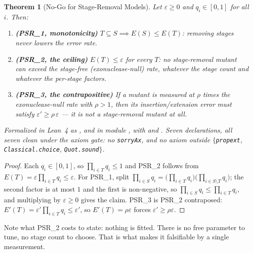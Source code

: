 \documentclass[11pt,a4paper]{article}
\newtheorem{theorem}{Theorem}[section]
\theoremstyle{definition}
\theoremstyle{remark}
\begin{document}
\begin{theorem}[No-Go for Stage-Removal Models]\label{thm:psr}
Let $\varepsilon \ge 0$ and $q_i \in [0,1]$ for all $i$. Then:
\begin{enumerate}
  \item \textbf{(PSR\_1, monotonicity)} $T \subseteq S \implies E(S) \le E(T)$: removing stages never lowers the error rate.
  \item \textbf{(PSR\_2, the ceiling)} $E(T) \le \varepsilon$ for every $T$: \emph{no} stage-removal mutant can exceed the stage-free (exonuclease-null) rate, whatever the stage count and whatever the per-stage factors.
  \item \textbf{(PSR\_3, the contrapositive)} If a mutant is measured at $\rho$ times the exonuclease-null rate with $\rho > 1$, then its insertion/extension error must satisfy $\varepsilon' \ge \rho\,\varepsilon$ --- it is not a stage-removal mutant at all.
\end{enumerate}
Formalized in Lean~4 as ,  and  in module , with  and . Seven declarations, all seven clean under the axiom gate: no \texttt{sorryAx}, and no axiom outside $\{$\texttt{propext}, \texttt{Classical.choice}, \texttt{Quot.sound}$\}$.
\end{theorem}

\begin{proof}
Each $q_i \in [0,1]$, so $\prod_{i \in T} q_i \le 1$ and PSR\_2 follows from $E(T) = \varepsilon \prod_{i\in T} q_i \le \varepsilon$. For PSR\_1, split $\prod_{i\in S} q_i = \big(\prod_{i\in T} q_i\big)\big(\prod_{i \in S\setminus T} q_i\big)$; the second factor is at most $1$ and the first is non-negative, so $\prod_{i\in S} q_i \le \prod_{i \in T} q_i$, and multiplying by $\varepsilon \ge 0$ gives the claim. PSR\_3 is PSR\_2 contraposed: $E'(T) = \varepsilon'\prod_{i\in T} q_i \le \varepsilon'$, so $E'(T) = \rho\varepsilon$ forces $\varepsilon' \ge \rho\varepsilon$.
\end{proof}

Note what PSR\_2 costs to state: nothing is fitted. There is no free parameter to tune, no stage count to choose. That is what makes it falsifiable by a single measurement.
\end{document}
